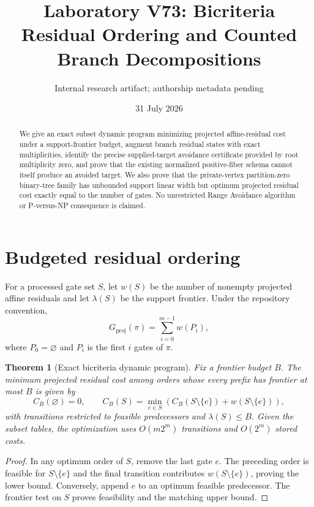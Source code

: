 \documentclass[11pt]{article}
\title{Laboratory V73: Bicriteria Residual Ordering and Counted Branch Decompositions}
\author{Internal research artifact; authorship metadata pending}
\date{31 July 2026}
\newtheorem{theorem}{Theorem}
\newcommand{\Gproj}{G_{\mathrm{proj}}}
\begin{document}
\maketitle

\begin{abstract}
We give an exact subset dynamic program minimizing projected affine-residual
cost under a support-frontier budget, augment branch residual states with exact
multiplicities, identify the precise supplied-target avoidance certificate
provided by root multiplicity zero, and prove that the existing normalized
positive-fiber schema cannot itself produce an avoided target.  We also prove
that the private-vertex partition-zero binary-tree family has unbounded support
linear width but optimum projected residual cost exactly equal to the number of
gates.  No unrestricted Range Avoidance algorithm or P-versus-NP consequence
is claimed.
\end{abstract}

\section{Budgeted residual ordering}

For a processed gate set $S$, let $w(S)$ be the number of nonempty projected
affine residuals and let $\lambda(S)$ be the support frontier.  Under the
repository convention,
\[
  \Gproj(\pi)=\sum_{i=0}^{m-1} w(P_i),
\]
where $P_0=\varnothing$ and $P_i$ is the first $i$ gates of $\pi$.

\begin{theorem}[Exact bicriteria dynamic program]
Fix a frontier budget $B$.  The minimum projected residual cost among orders
whose every prefix has frontier at most $B$ is given by
\[
 C_B(\varnothing)=0,\qquad
 C_B(S)=\min_{e\in S}\left(C_B(S\setminus\{e\})+w(S\setminus\{e\})\right),
\]
with transitions restricted to feasible predecessors and $\lambda(S)\le B$.
Given the subset tables, the optimization uses $O(m2^m)$ transitions and
$O(2^m)$ stored costs.
\end{theorem}

\begin{proof}
In any optimum order of $S$, remove the last gate $e$.  The preceding order is
feasible for $S\setminus\{e\}$ and the final transition contributes
$w(S\setminus\{e\})$, proving the lower bound.  Conversely, append $e$ to an
optimum feasible predecessor.  The frontier test on $S$ proves feasibility and
the matching upper bound.
\end{proof}
\end{document}
